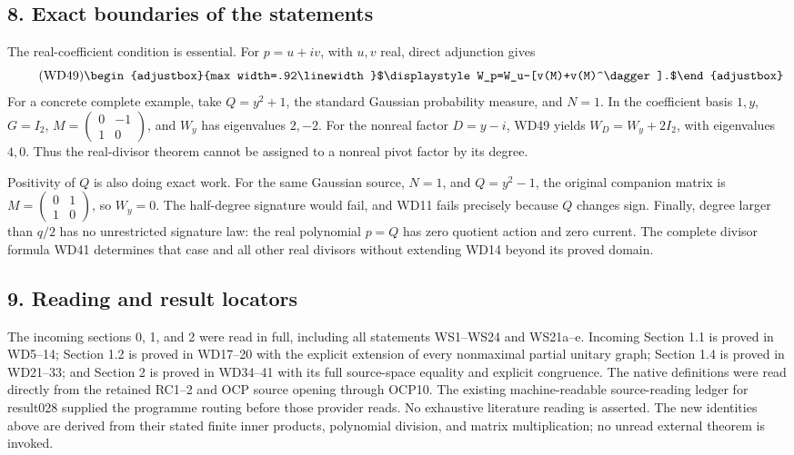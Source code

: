 \documentclass[11pt]{article}
\begin{document}
\subsection{8. Exact boundaries of the statements}\label{part2-exact-boundaries-of-the-statements}

The real-coefficient condition is essential. For \(p=u+iv\), with \(u,v\) real, direct adjunction gives 
\begin{equation*}
\tag{WD49}
\begin{adjustbox}{max width=.92\linewidth}$\displaystyle W_p=W_u-[v(M)+v(M)^\dagger].$\end{adjustbox}
\end{equation*}
 For a concrete complete example, take \(Q=y^2+1\), the standard Gaussian probability measure, and \(N=1\). In the coefficient basis \(1,y\), \(G=I_2\), \(M=\begin{pmatrix}0&-1\\1&0\end{pmatrix}\), and \(W_y\) has eigenvalues \(2,-2\). For the nonreal factor \(D=y-i\), WD49 yields \(W_D=W_y+2I_2\), with eigenvalues \(4,0\). Thus the real-divisor theorem cannot be assigned to a nonreal pivot factor by its degree.

Positivity of \(Q\) is also doing exact work. For the same Gaussian source, \(N=1\), and \(Q=y^2-1\), the original companion matrix is \(M=\begin{pmatrix}0&1\\1&0\end{pmatrix}\), so \(W_y=0\). The half-degree signature would fail, and WD11 fails precisely because \(Q\) changes sign. Finally, degree larger than \(q/2\) has no unrestricted signature law: the real polynomial \(p=Q\) has zero quotient action and zero current. The complete divisor formula WD41 determines that case and all other real divisors without extending WD14 beyond its proved domain.

\subsection{9. Reading and result locators}\label{part2-reading-and-result-locators}

The incoming sections 0, 1, and 2 were read in full, including all statements WS1--WS24 and WS21a--e. Incoming Section 1.1 is proved in WD5--14; Section 1.2 is proved in WD17--20 with the explicit extension of every nonmaximal partial unitary graph; Section 1.4 is proved in WD21--33; and Section 2 is proved in WD34--41 with its full source-space equality and explicit congruence. The native definitions were read directly from the retained RC1--2 and OCP source opening through OCP10. The existing machine-readable source-reading ledger for result028 supplied the programme routing before those provider reads. No exhaustive literature reading is asserted. The new identities above are derived from their stated finite inner products, polynomial division, and matrix multiplication; no unread external theorem is invoked.
\end{document}
